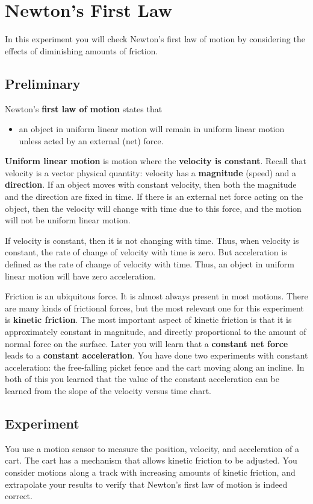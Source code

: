 \chapter{Newton's First Law}
%
In this experiment you will check Newton's first law of motion by considering the effects of diminishing amounts of friction.
%
\section{Preliminary}
%
Newton's \textbf{first law of motion} states that
\begin{itemize}
    \item an object in uniform linear motion will remain in uniform linear motion unless acted by an external (net) force.
\end{itemize}
\textbf{Uniform linear motion} is motion where the \textbf{velocity is constant}. Recall that velocity is a vector physical quantity: velocity has a \textbf{magnitude} (speed) and a \textbf{direction}. If an object moves with constant velocity, then both the magnitude and the direction are fixed in time. If there is an external net force acting on the object, then the velocity will change with time due to this force, and the motion will not be uniform linear motion.

If velocity is constant, then it is not changing with time. Thus, when velocity is constant, the rate of change of velocity with time is zero. But acceleration is defined as the rate of change of velocity with time. Thus, an object in uniform linear motion will have zero acceleration.

Friction is an ubiquitous force. It is almost always present in most motions. There are many kinds of frictional forces, but the most relevant one for this experiment is \textbf{kinetic friction}. The most important aspect of kinetic friction is that it is approximately constant in magnitude, and directly proportional to the amount of normal force on the surface. Later you will learn that a \textbf{constant net force} leads to a \textbf{constant acceleration}. You have done two experiments with constant acceleration: the free-falling picket fence and the cart moving along an incline. In both of this you learned that the value of the constant acceleration can be learned from the slope of the velocity versus time chart.
%
\section{Experiment}
%
You use a motion sensor to measure the position, velocity, and acceleration of a cart. The cart has a mechanism that allows kinetic friction to be adjusted. You consider motions along a track with increasing amounts of kinetic friction, and extrapolate your results to verify that Newton's first law of motion is indeed correct.
%
